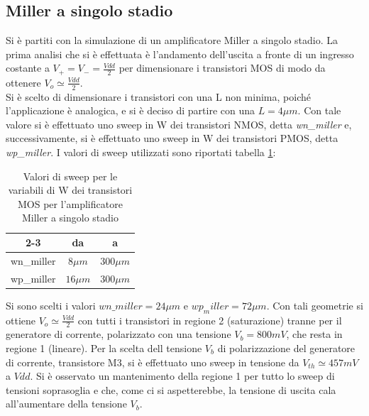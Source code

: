 \documentclass[a4paper]{article}
\begin{document}
        \subsection*{Miller a singolo stadio}
            Si è partiti con la simulazione di un amplificatore Miller a singolo stadio. La prima analisi che si è effettuata è l'andamento dell'uscita a fronte di un ingresso costante a $V_+ = V_- = \frac{Vdd}{2}$ per dimensionare i transistori MOS di modo da ottenere $V_o \simeq \frac{Vdd}{2}$. \\
            Si è scelto di dimensionare i transistori con una L non minima, poiché l'applicazione è analogica, e si è deciso di partire con una $L = 4\mu m$. Con tale valore si è effettuato uno sweep in W dei transistori NMOS, detta \textit{wn\_miller} e, successivamente, si è effettuato uno sweep in W dei transistori PMOS, detta \textit{wp\_miller}.
            I valori di sweep utilizzati sono riportati tabella \ref{tab:sweep_wn_wp}:
            \begin{table}[]
                \centering
                \begin{tabular}{c|c|c|}
                    \cline{2-3}
                                                     & da        & a          \\ \hline
                    \multicolumn{1}{|c|}{wn\_miller} & $8\mu m$  & $300\mu m$ \\ \hline
                    \multicolumn{1}{|c|}{wp\_miller} & $16\mu m$ & $300\mu m$ \\ \hline
                    \end{tabular}
                \label{tab:sweep_wn_wp}
                \caption[short]{Valori di sweep per le variabili di W dei transistori MOS per l'amplificatore Miller a singolo stadio}
            \end{table}
            Si sono scelti i valori $wn\_miller = 24\mu m$ e $wp_miller = 72\mu m$. 
            Con tali geometrie si ottiene $V_o \simeq \frac{Vdd}{2}$ con tutti i transistori in regione 2 (saturazione) tranne per il generatore di corrente, polarizzato con una tensione $V_b = 800mV$, che resta in regione 1 (lineare).
            Per la scelta dell tensione $V_b$ di polarizzazione del generatore di corrente, transistore M3, si è effettuato uno sweep in tensione da $V_{th} \simeq 457mV$ a $Vdd$. Si è osservato un mantenimento della regione 1 per tutto lo sweep di tensioni soprasoglia e che, come ci si aspetterebbe, la tensione di uscita cala all'aumentare della tensione $V_b$.
\end{document}
